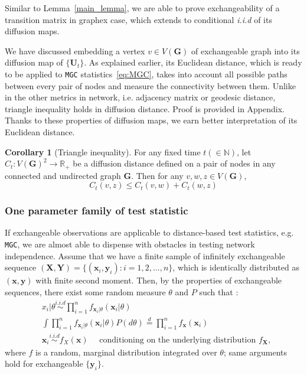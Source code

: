 \documentclass[12pt]{article}
\theoremstyle{definition}
\newtheorem{corollary}{Corollary}[theorem]
\begin{document}
Similar to Lemma~\ref{main_lemma}, we are able to prove exchangeability of a transition matrix in graphex case, which extends to conditional \textit{i.i.d} of its diffusion maps. 

We have discussed embedding a vertex $v \in V(\mathbf{G})$ of exchangeable graph into its diffusion map of $\{\mathbf{U}_{t}\}$. As explained earlier, its Euclidean distance, which is ready to be applied to \texttt{MGC} statistics~\ref{eq:MGC}, takes into account all possible paths between every pair of nodes and measure the connectivity between them. Unlike in the other metrics in network, i.e. adjacency matrix or geodesic distance, triangle inequality holds in diffusion distance. Proof is provided in Appendix. Thanks to these properties of diffusion maps, we earn better interpretation of its Euclidean distance.
\begin{corollary}[Triangle inequality]
	\label{corollary1}
	For any fixed time $t (\in \mathbb{N})$, let $C_{t} : V(\mathbf{G})^2 \rightarrow \mathbb{R}_{+}$ be a diffusion distance defined on a pair of nodes in any connected and undirected graph $\mathbf{G}$. Then for any $v, w, z \in V(\mathbf{G})$,  
	\begin{equation}
	C_{t}(v,z) \leq C_{t}(v,w) + C_{t}(w,z)
	\end{equation}
\end{corollary}		
\subsubsection{One parameter family of test statistic}

If exchangeable observations are applicable to distance-based test statistics, e.g. \texttt{MGC}, we are almost able to dispense with obstacles in testing network independence.  Assume that we have a finite sample of infinitely exchangeable sequence $(\mathbf{X}, \mathbf{Y}) = \{ ( \mathbf{x}_{i}, \mathbf{y}_{i} ) : i=1,2, \ldots, n \}$, which is identically distributed as $(\mathbf{x}, \mathbf{y})$ with finite second moment. Then, by the properties of exchangeable sequences, there exist some random measure $\theta$ and $P$ such that : 
\begin{equation}
\begin{split}
& x_{i} | \theta  \overset{i.i.d}{\sim} \prod\limits_{i=1}^{n} f_{\mathbf{x}_{i} | \theta}(\mathbf{x}_{i} | \theta)  \\
& \int \prod\limits_{i=1}^{n} f_{ \mathbf{x}_{i} | \theta} ( \mathbf{x}_{i} | \theta ) P(d\theta)  \stackrel{d}{=}   \prod\limits_{i=1}^{n} f_{\mathbf{x}}(\mathbf{x}_{i})  \\
& \mathbf{x}_{i}   \overset{i.i.d}{\sim}  f_{X}(\mathbf{x})  \quad \mbox{ conditioning on the underlying distribution } f_{\mathbf{X}},
\end{split}
\label{eq:iid}
\end{equation}
where $f$ is a random, marginal distribution integrated over $\theta$; same arguments hold for exchangeable $\{ \mathbf{y}_{i}  \}$.
\end{document}

